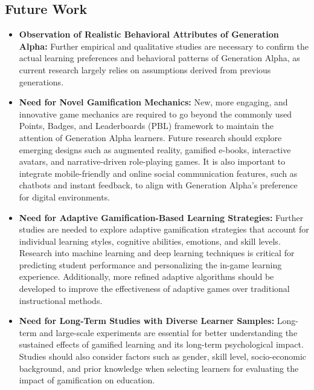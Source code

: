 \subsection{Future Work}
\begin{itemize}
    \item \textbf{Observation of Realistic Behavioral Attributes of Generation Alpha:}
    Further empirical and qualitative studies are necessary to confirm the actual learning preferences and behavioral patterns of Generation Alpha, as current research largely relies on assumptions derived from previous generations.

    \item \textbf{Need for Novel Gamification Mechanics:}
    New, more engaging, and innovative game mechanics are required to go beyond the commonly used Points, Badges, and Leaderboards (PBL) framework to maintain the attention of Generation Alpha learners.
    Future research should explore emerging designs such as augmented reality, gamified e-books, interactive avatars, and narrative-driven role-playing games. It is also important to integrate mobile-friendly and online social communication features, such as chatbots and instant feedback, to align with Generation Alpha's preference for digital environments.

    \item \textbf{Need for Adaptive Gamification-Based Learning Strategies:}
    Further studies are needed to explore adaptive gamification strategies that account for individual learning styles, cognitive abilities, emotions, and skill levels. Research into machine learning and deep learning techniques is critical for predicting student performance and personalizing the in-game learning experience. Additionally, more refined adaptive algorithms should be developed to improve the effectiveness of adaptive games over traditional instructional methods.

    \item \textbf{Need for Long-Term Studies with Diverse Learner Samples:}
    Long-term and large-scale experiments are essential for better understanding the sustained effects of gamified learning and its long-term psychological impact. Studies should also consider factors such as gender, skill level, socio-economic background, and prior knowledge when selecting learners for evaluating the impact of gamification on education.
\end{itemize}

